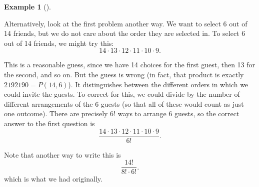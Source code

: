 \documentclass[10pt,]{book}
\theoremstyle{plain}
\theoremstyle{definition}
\theoremstyle{definition}
\newtheorem{example}[theorem]{Example}
\theoremstyle{definition}
\theoremstyle{definition}
\numberwithin{equation}{chapter}
\begin{document}
\begin{example}[]
\par
\hypertarget{p-928}{}%
Alternatively, look at the first problem another way. We want to select 6 out of 14 friends, but we do not care about the order they are selected in. To select 6 out of 14 friends, we might try this:%
\begin{equation*}
14 \cdot 13 \cdot 12 \cdot 11 \cdot 10 \cdot 9.
\end{equation*}
%
\par
\hypertarget{p-929}{}%
This is a reasonable guess, since we have 14 choices for the first guest, then 13 for the second, and so on. But the guess is wrong (in fact, that product is exactly \(2192190 = P(14,6)\)). It distinguishes between the different orders in which we could invite the guests. To correct for this, we could divide by the number of different arrangements of the 6 guests (so that all of these would count as just one outcome). There are precisely \(6!\) ways to arrange 6 guests, so the correct answer to the first question is%
\begin{equation*}
\frac{14 \cdot 13 \cdot 12 \cdot 11\cdot 10 \cdot 9}{6!}.
\end{equation*}
%
\par
\hypertarget{p-930}{}%
Note that another way to write this is%
\begin{equation*}
\frac{14!}{8!\cdot 6!}.
\end{equation*}
which is what we had originally.%
\end{example}
\typeout{************************************************}
\typeout{************************************************}
\end{document}
